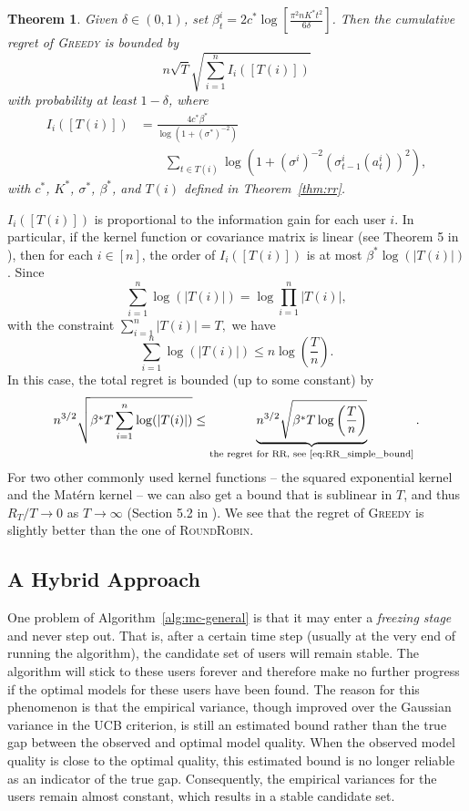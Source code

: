 \documentclass[letterpaper]{vldb}
\newcommand{\rr}{\textsc{RoundRobin}\xspace}
\newcommand{\greedy}{\textsc{Greedy}\xspace}
\newtheorem{theorem}{Theorem}
\begin{document}
\vspace{-0.5em}
\begin{theorem}
  \label{thm:multi-cost}
  Given $\delta\in (0,1)$, set $\beta_t^i = 2c^\ast \log\left[ \frac{\pi^2 n K^\ast t^2}{6\delta} \right]$. Then the
  cumulative regret of \greedy is bounded  by
  \[
    n \sqrt{T}\sqrt{\sum_{i=1}^n I_i([T(i)])}
  \]
  with probability at least $1-\delta$,
  where
  \begin{align*}
    I_i([T(i)]) & =  \frac{4c^\ast \beta^\ast}{\log(1 + (\sigma^\ast)^{-2})}\\
    &\qquad \sum_{t\in T(i)} \log\left(1 + (\sigma^i)^{-2}(\sigma^i_{t-1}(a^i_{t}))^2\right),
  \end{align*}
  with $c^\ast$, $K^\ast$, $\sigma^\ast$, $\beta^\ast$, and $T(i)$ defined in Theorem~\ref{thm:rr}.
\end{theorem}

$I_i([T(i)])$ is proportional to the information gain for each user $i$. In particular, if the kernel function or covariance matrix is linear (see
  Theorem 5 in \cite{SrinivasKKS10}), then for each $i\in [n]$, the
  order of $I_i([T(i)])$ is at most $\beta^\ast \log(|T(i)|)$. Since
  \[
    \sum_{i=1}^n \log(|T(i)|) = \log \prod_{i=1}^n |T(i)|,
    \]
  with the constraint
    $\sum_{i=1}^n|T(i)| = T,$
  we have
  \[
    \sum_{i=1}^n \log(|T(i)|) \le n \log \left(\frac{T}{n}\right).
  \]
  In this case, the total regret is bounded (up to some constant) by
  \[
 n^{3/2}\sqrt{\beta^\ast T\sum_{i=1}^n \log(|T(i)|)}  \leq \underbrace{n^{3/2}\sqrt{\beta^\ast T \log\left( \frac{T}{n}\right)}}_{\text{the regret for RR, see \eqref{eq:RR_simple_bound}}}.
  \]
For two other commonly used kernel functions -- the squared exponential kernel and the Mat\'{e}rn kernel -- we can also get a bound that is sublinear in $T$, and thus $R_T/T \to 0$ as $T\to\infty$ (Section 5.2 in \cite{SrinivasKKS10}). We see that the regret of \greedy is slightly better than the one of \rr. 

\vspace{0.5em}
\subsection{A Hybrid Approach}

One problem of Algorithm~\ref{alg:mc-general} is that it may enter a \emph{freezing stage} and never step out.
That is, after a certain time step (usually at the very end of running the algorithm), the candidate set of users will remain stable.
The algorithm will stick to these users forever and therefore make no further progress if the optimal models for these users have been found.
The reason for this phenomenon is that the empirical variance, though improved over the Gaussian variance in the UCB criterion, is still an estimated bound rather than the true gap between the observed and optimal model quality.
When the observed model quality is close to the optimal quality, this estimated bound is no longer reliable as an indicator of the true gap.
Consequently, the empirical variances for the users remain almost constant, which results in a stable candidate set.
\end{document}
